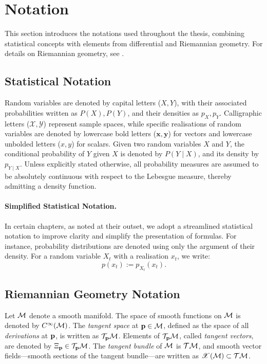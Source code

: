 
\section*{Notation}
\label{sec:notation}

This section introduces the notations used throughout the thesis, combining statistical concepts with elements from differential and Riemannian geometry. For details on Riemannian geometry, see \cite{boothby2003introduction,carmo1992riemannian,lee2013smooth,sakai1996riemannian}.

\subsection*{Statistical Notation}
Random variables are denoted by capital letters (\(X, Y\)), with their associated probabilities written as \(P(X), P(Y)\), and their densities as \(p_X, p_Y\). Calligraphic letters (\(\mathcal{X}, \mathcal{Y}\)) represent sample spaces, while specific realisations of random variables are denoted by lowercase bold letters (\(\mathbf{x}, \mathbf{y}\)) for vectors and lowercase unbolded letters (\(x, y\)) for scalars. Given two random variables \(X\) and \(Y\), the conditional probability of \(Y\) given \(X\) is denoted by \(P(Y \mid X)\), and its density by \(p_{Y \mid X}\). Unless explicitly stated otherwise, all probability measures are assumed to be absolutely continuous with respect to the Lebesgue measure, thereby admitting a density function.

\paragraph{Simplified Statistical Notation.}  
In certain chapters, as noted at their outset, we adopt a streamlined statistical notation to improve clarity and simplify the presentation of formulas. For instance, probability distributions are denoted using only the argument of their density. For a random variable \(X_t\) with a realisation \(x_t\), we write:  
\[
p(x_t) := p_{X_t}(x_t).
\]

\subsection*{Riemannian Geometry Notation}
Let \(\mathcal{M}\) denote a smooth manifold. The space of smooth functions on \(\mathcal{M}\) is denoted by \(C^\infty(\mathcal{M})\). The \emph{tangent space} at \(\mathbf{p} \in \mathcal{M}\), defined as the space of all \emph{derivations} at \(\mathbf{p}\), is written as \(\mathcal{T}_{\mathbf{p}} \mathcal{M}\). Elements of \(\mathcal{T}_{\mathbf{p}} \mathcal{M}\), called \emph{tangent vectors}, are denoted by \(\Xi_{\mathbf{p}} \in \mathcal{T}_{\mathbf{p}} \mathcal{M}\). The \emph{tangent bundle} of \(\mathcal{M}\) is \(\mathcal{T} \mathcal{M}\), and smooth vector fields—smooth sections of the tangent bundle—are written as \(\mathscr{X}(\mathcal{M}) \subset \mathcal{T} \mathcal{M}\).

